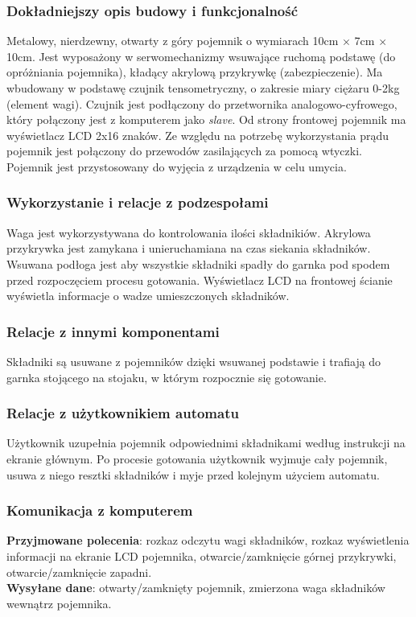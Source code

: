 \documentclass[12pt,a4paper,notitlepage]{article}
\begin{document}
\subsubsection{Dokładniejszy opis budowy i funkcjonalność}
Metalowy, nierdzewny, otwarty z góry pojemnik o wymiarach 10cm $\times$ 7cm $\times$ 10cm. Jest wyposażony w serwomechanizmy wsuwające ruchomą podstawę (do opróżniania pojemnika), kładący akrylową przykrywkę (zabezpieczenie). Ma wbudowany w podstawę czujnik tensometryczny, o zakresie miary ciężaru 0-2kg (element wagi). Czujnik jest podłączony do przetwornika analogowo-cyfrowego, który połączony jest z komputerem jako \emph{slave}. Od strony frontowej pojemnik ma wyświetlacz LCD 2x16 znaków. Ze względu na potrzebę wykorzystania prądu pojemnik jest połączony do przewodów zasilających za pomocą wtyczki. Pojemnik jest przystosowany do wyjęcia z urządzenia w celu umycia.
 
\subsubsection{Wykorzystanie i relacje z podzespołami}
Waga jest wykorzystywana do kontrolowania ilości składnikiów. Akrylowa przykrywka jest zamykana i unieruchamiana na czas siekania składników. Wsuwana podłoga jest aby wszystkie składniki spadły do garnka pod spodem przed rozpoczęciem procesu gotowania. Wyświetlacz LCD na frontowej ścianie wyświetla informacje o wadze umieszczonych składników.

\subsubsection{Relacje z innymi komponentami}
Składniki są usuwane z pojemników dzięki wsuwanej podstawie i trafiają do garnka stojącego na stojaku, w którym rozpocznie się gotowanie.

\subsubsection{Relacje z użytkownikiem automatu}
Użytkownik uzupełnia pojemnik odpowiednimi składnikami według instrukcji na ekranie głównym. Po procesie gotowania użytkownik wyjmuje cały pojemnik, usuwa z niego resztki składników i myje przed kolejnym użyciem automatu.

\subsubsection{Komunikacja z komputerem}
\textbf{Przyjmowane polecenia}: rozkaz odczytu wagi składników, rozkaz wyświetlenia informacji na ekranie LCD pojemnika, otwarcie/zamknięcie górnej przykrywki, otwarcie/zamknięcie zapadni.\\
\textbf{Wysyłane dane}: otwarty/zamknięty pojemnik, zmierzona waga składników wewnątrz pojemnika.
\end{document}
